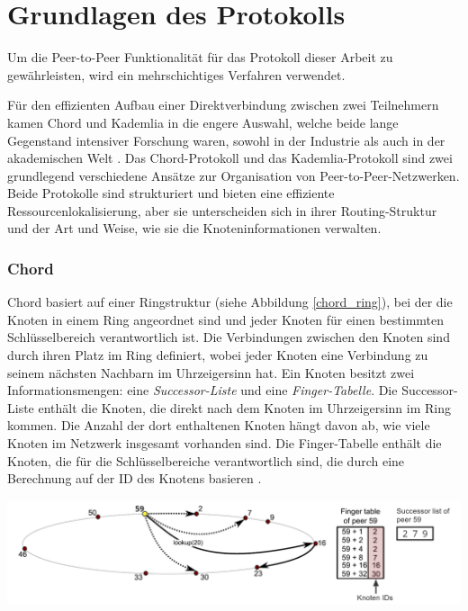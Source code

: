 \section{Grundlagen des Protokolls}
\label{sec:grundlagen_des_protokolls}


Um die Peer-to-Peer Funktionalität für das Protokoll dieser Arbeit zu gewährleisten, wird ein mehrschichtiges Verfahren verwendet.

Für den effizienten Aufbau einer Direktverbindung zwischen zwei Teilnehmern kamen Chord und Kademlia in die engere Auswahl, welche beide lange Gegenstand intensiver Forschung waren, sowohl in der Industrie als auch in der akademischen Welt \parencite[S. 808]{MedranoChavez_ChordKademliaHighChurnScenarios}. 
Das Chord-Protokoll und das Kademlia-Protokoll sind zwei grundlegend verschiedene Ansätze zur Organisation von Peer-to-Peer-Netzwerken. Beide Protokolle sind strukturiert und bieten eine effiziente Ressourcenlokalisierung, aber sie unterscheiden sich in ihrer Routing-Struktur und der Art und Weise, wie sie die Knoteninformationen verwalten.

\subsubsection{Chord}
Chord basiert auf einer Ringstruktur (siehe Abbildung \ref{chord_ring}), bei der die Knoten in einem Ring angeordnet sind und jeder Knoten für einen bestimmten Schlüsselbereich verantwortlich ist. Die Verbindungen zwischen den Knoten sind durch ihren Platz im Ring definiert, wobei jeder Knoten eine Verbindung zu seinem nächsten Nachbarn im Uhrzeigersinn hat. Ein Knoten besitzt zwei Informationsmengen: eine \textit{Successor-Liste} und eine \textit{Finger-Tabelle}. Die Successor-Liste enthält die Knoten, die direkt nach dem Knoten im Uhrzeigersinn im Ring kommen. Die Anzahl der dort enthaltenen Knoten hängt davon ab, wie viele Knoten im Netzwerk insgesamt vorhanden sind. Die Finger-Tabelle enthält die Knoten, die für die Schlüsselbereiche verantwortlich sind, die durch eine Berechnung auf der ID des Knotens basieren \Parencite[S. 810-811]{MedranoChavez_ChordKademliaHighChurnScenarios}.

\begin{center}
    \captionsetup{type=figure}
    \includegraphics[width=1\linewidth]{images/chord_ring_altered.png}
    \label{chord_ring}
\end{center}

